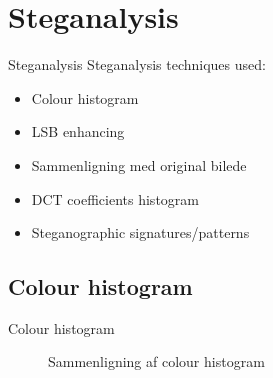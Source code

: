 \section{Steganalysis}
\begin{frame}{Steganalysis}{}
	Steganalysis techniques used:
	\begin{itemize}
		\item Colour histogram
		\item LSB enhancing
		\item Sammenligning med original bilede
		\item DCT coefficients histogram
		\item Steganographic signatures/patterns
	\end{itemize}
\end{frame}

\subsection{Colour histogram} %
\begin{frame}{Colour histogram}{}
\begin{figure}
\centering     %
{}
\end{figure}
\begin{figure}
\centering
{}
\caption{Sammenligning af colour histogram}
\end{figure}
\end{frame}

